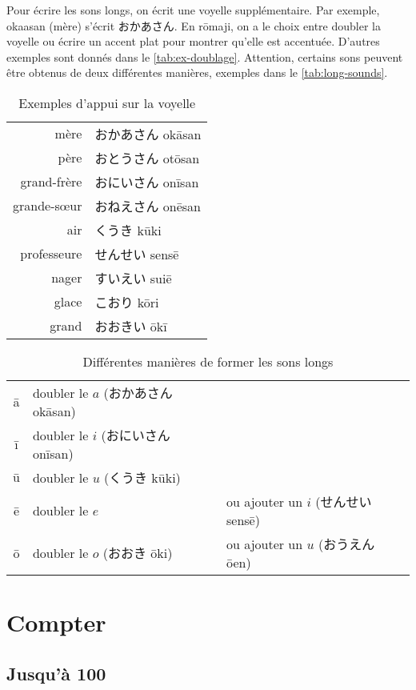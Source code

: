\documentclass[a4paper,10pt,french,openany]{memoir}
\begin{document}
Pour écrire les sons longs, on écrit une voyelle supplémentaire. Par exemple, okaasan (mère) s'écrit おかあさん. En rōmaji, on a le choix entre doubler la voyelle ou écrire un accent plat pour montrer qu'elle est accentuée. D'autres exemples sont donnés dans le \autoref{tab:ex-doublage}. Attention, certains sons peuvent être obtenus de deux différentes manières, exemples dans le \autoref{tab:long-sounds}.

\begin{table}[htbp]
 \centering
 \begin{tabular}{rl}
  mère & おかあさん okāsan \\
  père & おとうさん otōsan\\
  grand-frère & おにいさん onīsan\\
  grande-sœur & おねえさん onēsan\\
  air & くうき kūki\\
  professeur\cdot{}e & せんせい sensē\\
  nager & すいえい suiē\\
  glace & こおり kōri\\
  grand & おおきい ōkī\\
 \end{tabular}
 \caption{Exemples d'appui sur la voyelle}
 \label{tab:ex-doublage}
\end{table}

\begin{table}[htbp]
 \centering
 \begin{tabular}{cll}
  ā & doubler le $a$ (おかあさん okāsan)\\
  ī & doubler le $i$ (おにいさん onīsan)\\
  ū & doubler le $u$ (くうき kūki)\\
  ē & doubler le $e$ & ou ajouter un $i$ (せんせい sensē)\\
  ō & doubler le $o$ (おおき ōki) & ou ajouter un $u$ (おうえん ōen)\\
 \end{tabular}
 \caption{Différentes manières de former les sons longs}
 \label{tab:long-sounds}
\end{table}

\chapter{Compter}
\section{Jusqu'à 100}
\end{document}
